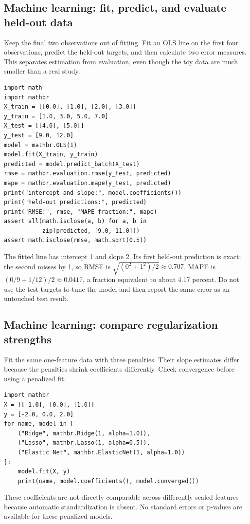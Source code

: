 \documentclass[11pt,a4paper]{article}
\begin{document}
\subsection{Machine learning: fit, predict, and evaluate held-out data}
Keep the final two observations out of fitting. Fit an OLS line on the first four observations, predict the held-out targets, and then calculate two error measures. This separates estimation from evaluation, even though the toy data are much smaller than a real study.
\begin{verbatim}
import math
import mathbr
X_train = [[0.0], [1.0], [2.0], [3.0]]
y_train = [1.0, 3.0, 5.0, 7.0]
X_test = [[4.0], [5.0]]
y_test = [9.0, 12.0]
model = mathbr.OLS(1)
model.fit(X_train, y_train)
predicted = model.predict_batch(X_test)
rmse = mathbr.evaluation.rmse(y_test, predicted)
mape = mathbr.evaluation.mape(y_test, predicted)
print("intercept and slope:", model.coefficients())
print("held-out predictions:", predicted)
print("RMSE:", rmse, "MAPE fraction:", mape)
assert all(math.isclose(a, b) for a, b in
           zip(predicted, [9.0, 11.0]))
assert math.isclose(rmse, math.sqrt(0.5))
\end{verbatim}
The fitted line has intercept 1 and slope 2. Its first held-out prediction is exact; the second misses by 1, so RMSE is $\sqrt{(0^2+1^2)/2}\approx0.707$. MAPE is $(0/9+1/12)/2\approx0.0417$, a fraction equivalent to about 4.17 percent. Do not use the test targets to tune the model and then report the same error as an untouched test result.

\subsection{Machine learning: compare regularization strengths}
Fit the same one-feature data with three penalties. Their slope estimates differ because the penalties shrink coefficients differently. Check convergence before using a penalized fit.
\begin{verbatim}
import mathbr
X = [[-1.0], [0.0], [1.0]]
y = [-2.0, 0.0, 2.0]
for name, model in [
    ("Ridge", mathbr.Ridge(1, alpha=1.0)),
    ("Lasso", mathbr.Lasso(1, alpha=0.5)),
    ("Elastic Net", mathbr.ElasticNet(1, alpha=1.0))
]:
    model.fit(X, y)
    print(name, model.coefficients(), model.converged())
\end{verbatim}
These coefficients are not directly comparable across differently scaled features because automatic standardization is absent. No standard errors or p-values are available for these penalized models.
\end{document}
